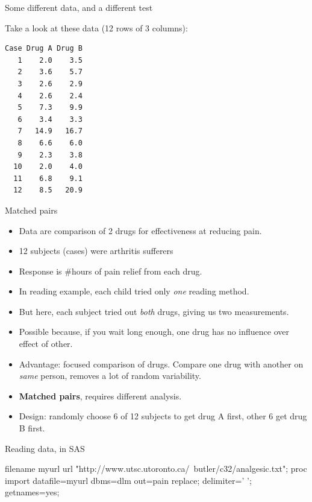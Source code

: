 \documentclass[unknownkeysallowed]{beamer}\usepackage[]{graphicx}\usepackage[]{color}
\begin{document}
\begin{frame}[fragile]{Some different data, and a different test}

Take a look at these data (12 rows of 3 columns):

\bigskip

\begin{multicols}{2}
\begin{verbatim}
Case Drug A Drug B
   1    2.0    3.5
   2    3.6    5.7
   3    2.6    2.9
   4    2.6    2.4
   5    7.3    9.9
   6    3.4    3.3
   7   14.9   16.7
   8    6.6    6.0
   9    2.3    3.8
  10    2.0    4.0
  11    6.8    9.1
  12    8.5   20.9
\end{verbatim}
  
\end{multicols}


\end{frame}

\begin{frame}[fragile]{Matched pairs}
  
  \begin{itemize}
  \item Data are comparison of 2 drugs for effectiveness at reducing pain.
  \item 12 subjects (cases) were arthritis sufferers
  \item Response is \#hours of pain relief from each drug.
  \item In reading example, each child tried only \emph{one} reading method.
  \item But here, each subject tried out \emph{both} drugs, giving us
    two measurements.
  \item Possible because, if you wait long enough, one drug has no
    influence over effect of other.
  \item Advantage: focused comparison of drugs. Compare one drug with
    another on \emph{same} person, removes a lot of random variability.
  \item \textbf{Matched pairs}, requires different analysis.
  \item Design: randomly choose 6 of 12 subjects to get drug A first,
    other 6 get drug B first.
  \end{itemize}

\end{frame}

\begin{frame}[fragile]{Reading data, in SAS}


\begin{Datastep}
filename myurl url 
  "http://www.utsc.utoronto.ca/~butler/c32/analgesic.txt";  
proc import
  datafile=myurl
    dbms=dlm
    out=pain
    replace;
  delimiter=' ';
  getnames=yes;
\end{Datastep}


  
\end{frame}
\end{document}
